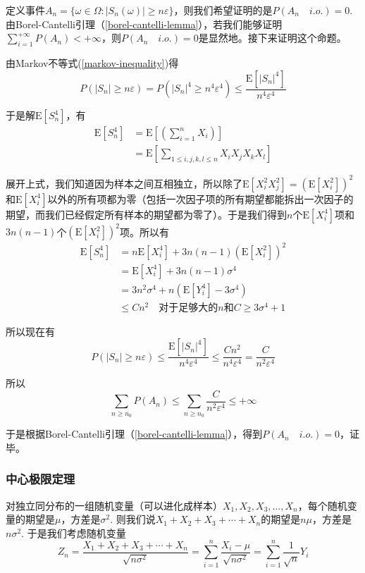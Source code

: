 \documentclass[UTF8]{ctexbook}
\begin{document}
定义事件$A_n=\{\omega\in\Omega:|S_n(\omega)|\geq n\varepsilon\}$，则我们希望证明的是$P(A_n\quad i.o.)=0$.由Borel-Cantelli引理（\ref{borel-cantelli-lemma}），若我们能够证明$\sum_{i=1}^{+\infty}P(A_n)<+\infty$，则$P(A_n\quad i.o.)=0$是显然地。接下来证明这个命题。

由Markov不等式(\ref{markov-inequality})得
\[
	P\left(|S_n|\geq n\varepsilon\right)=P\left(|S_n|^4\geq n^4\varepsilon^4\right)\leq\frac{\mathrm E[|S_n|^4]}{n^4\varepsilon^4}
\]

于是解$\mathrm E[S_n^4]$，有
\begin{align*}
	\mathrm E[S_n^4]&=\mathrm E\left[\left(\sum_{i=1}^nX_i\right)\right] \\
	&=\mathrm E\left[\sum_{1\leq i,j,k,l\leq n}X_iX_jX_kX_l\right]
\end{align*}

展开上式，我们知道因为样本之间互相独立，所以除了$\mathrm E[X_i^2X_j^2]=(\mathrm E[X_i^2])^2$和$\mathrm E[X_i^4]$以外的所有项都为零（包括一次因子项的所有期望都能拆出一次因子的期望，而我们已经假定所有样本的期望都为零了）。于是我们得到$n$个$\mathrm E[X_i^4]$项和$3n(n-1)$个$(\mathrm E[X_i^2])^2$项。所以有
\begin{align*}
	\mathrm E[S_n^4]&=n\mathrm E[X_i^4]+3n(n-1)(\mathrm E[X_i^2])^2\\
	&=\mathrm E[X_i^4]+3n(n-1)\sigma^4 \\
	&=3n^2\sigma^4+n(\mathrm E[Y_i^4]-3\sigma^4) \\
	&\leq Cn^2\quad\text{对于足够大的$n$和$C\geq3\sigma^4+1$}
\end{align*}

所以现在有
\[
	P\left(|S_n|\geq n\varepsilon\right)\leq\frac{\mathrm E[|S_n|^4]}{n^4\varepsilon^4}\leq\frac{Cn^2}{n^4\varepsilon^4}=\frac{C}{n^2\varepsilon^4}
\]

所以
\[
	\sum_{n\geq n_0}P(A_n)\leq\sum_{n\geq n_0}\frac{C}{n^2\varepsilon^4}\leq+\infty
\]

于是根据Borel-Cantelli引理（\ref{borel-cantelli-lemma}），得到$P(A_n\quad i.o.)=0$，证毕。
\subsubsection{中心极限定理}
\label{CLT-proof}
对独立同分布的一组随机变量（可以进化成样本）$X_1,X_2,X_3,\dots,X_n$，每个随机变量的期望是$\mu$，方差是$\sigma^2$. 则我们说$X_1+X_2+X_3+\cdots+X_n$的期望是$n\mu$，方差是$n\sigma^2$. 于是我们考虑随机变量
\[
	Z_n=\frac{X_1+X_2+X_3+\cdots+X_n}{\sqrt{n\sigma^2}}=\sum_{i=1}^n\frac{X_i-\mu}{\sqrt{n\sigma^2}}=\sum_{i=1}^n\frac{1}{\sqrt n}Y_i
\]
\end{document}
